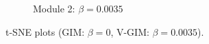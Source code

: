 \begin{figure}[h]
\begin{subfigure}{0.45\linewidth}
		\caption{Module 2: $\beta=0.0035$}
		\label{fig:t-sne-kld0-module-2}
	\end{subfigure}
	\caption{t-SNE plots (GIM: $\beta=0$, V-GIM: $\beta=0.0035$).}
	\label{fig:four_tsne_plots}
\end{figure}